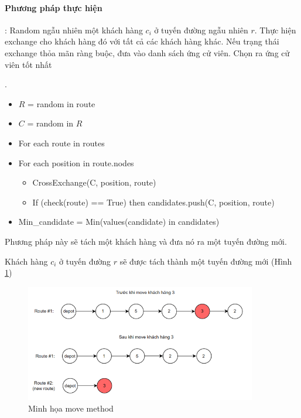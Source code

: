 \documentclass[12pt,a4paper]{article}\author{Nguyễn Nho Dũng}
\begin{document}
\paragraph{Phương pháp thực hiện}: Random ngẫu nhiên một khách hàng $c_i$ ở tuyến đường ngẫu nhiên $r$. Thực hiện exchange cho khách hàng đó với tất cả các khách hàng khác. Nếu trạng thái exchange thỏa mãn ràng buộc, đưa vào danh sách ứng cử viên. Chọn ra ứng cử viên tốt nhất
\begin{thuattoan}
	.
	\begin{itemize}
		\item $R$ = random in route
		\item $C$ = random in $R$
		\item For each route in routes
		\item For each position in route.nodes
		\begin{itemize}
			\item CrossExchange(C, position, route)
			\item If (check(route) == True) then candidates.push(C, position, route)
		\end{itemize}
		\item Min\_candidate = Min(values(candidate) in candidates)
	\end{itemize}
\end{thuattoan}
\begin{pphap}
	Phương pháp này sẽ tách một khách hàng và đưa nó ra một tuyến đường mới.
\end{pphap}
Khách hàng $c_i$ ở tuyến đường $r$ sẽ được tách thành một tuyến đường mới (Hình \ref{move_method})
\begin{figure}[H]
	\centering
	\includegraphics[width=0.9\textwidth]{Anh/move_method}
	\caption{Minh họa move method}
	\label{move_method}
\end{figure}
\end{document}
